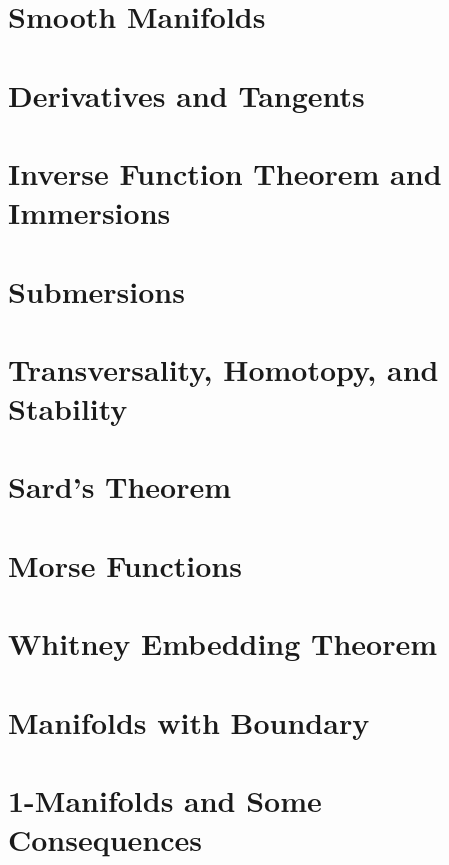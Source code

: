 \documentclass[12pt, a4paper]{report}
\begin{document}


\tableofcontents
\newpage

\chapter{Smooth Manifolds}


\chapter{Derivatives and Tangents}


\chapter{Inverse Function Theorem and Immersions}


\chapter{Submersions}


\chapter{Transversality, Homotopy, and Stability}


\chapter{Sard's Theorem}


\chapter{Morse Functions}


\chapter{Whitney Embedding Theorem}


\chapter{Manifolds with Boundary}


\chapter{1-Manifolds and Some Consequences}

\end{document}
